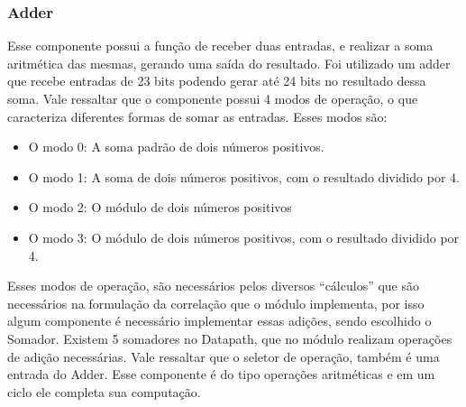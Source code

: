 \subsubsection{Adder}
Esse componente possui a função de receber duas entradas, e realizar a soma aritmética das mesmas, gerando uma saída do resultado. Foi utilizado um adder que recebe entradas de 23 bits podendo gerar até 24 bits no resultado dessa soma. Vale ressaltar que o componente possui 4 modos de operação, o que caracteriza diferentes formas de somar as entradas. Esses modos são:
\begin{itemize}
\item O modo 0: A soma padrão de dois números positivos.
\item O modo 1: A soma de dois números positivos, com o resultado dividido por 4.
\item O modo 2: O módulo de dois números positivos
\item O modo 3: O módulo de dois números positivos, com o resultado dividido por 4.
\end{itemize}

Esses modos de operação, são necessários pelos diversos “cálculos” que são necessários na formulação da correlação que o módulo implementa, por isso algum componente é necessário implementar essas adições, sendo escolhido o Somador.
Existem 5 somadores no Datapath, que no módulo realizam operações de adição necessárias. Vale ressaltar que o seletor de operação, também é uma entrada do Adder. Esse componente é do tipo operações aritméticas e em um ciclo ele completa sua computação.
